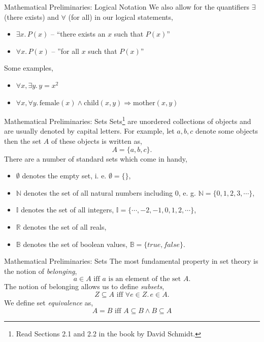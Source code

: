 \documentclass{beamer}
\begin{document}
\begin{frame}{\large Mathematical  Preliminaries: Logical Notation}
We also allow for the quantifiers $\exists$ (there exists) and $\forall$ (for all) in our logical
statements,
\begin{itemize}
\item $\exists x.\,P(x)$ -- ``there exists an $x$ such that $P(x)$''
\item $\forall x.\,P(x)$ -- ''for all $x$ such that $P(x)$''
\end{itemize}
Some examples,
\begin{itemize}
\item $\forall x,\exists y.\, y = x^2$
\item $\forall x, \forall y.\, \mbox{female}(x) \wedge \mbox{child}(x,y) \Rightarrow \mbox{mother}(x,y)$ 
\end{itemize}

\end{frame}


\begin{frame}{\large Mathematical  Preliminaries: Sets}
Sets\footnote{\tiny Read Sections 2.1 and 2.2 in the book by David Schmidt.}
 are unordered collections of objects and are usually denoted by capital letters.  For example,
let $a,b,c$ denote some objects then the set $A$ of these objects is written as,
\[
A = \{a,b,c\}.
\]
There are a number of standard sets which come in handy,
\begin{itemize}
\item $\emptyset$ denotes the empty set, i. e. $\emptyset = \{ \}$,
\item $\mathbb N$ denotes the set of all natural numbers including 0, e. g. ${\mathbb N} = \{0,1,2,3,\cdots\}$, 
\item $\mathbb I$ denotes the set of all integers, ${\mathbb I}= \{\cdots,-2,-1,0,1,2,\cdots\}$,
\item $\mathbb R$ denotes the set of all reals,
\item $\mathbb B$ denotes the set of boolean values, ${\mathbb B} = \{\mathit{true}, \mathit{false} \}$.
\end{itemize}
\end{frame}

\begin{frame}{\large Mathematical  Preliminaries: Sets}
The most fundamental property in set theory is the notion of {\em belonging},
\[
a \in A \mbox{ iff  $a$ is an element of the set $A$}.
\]
The notion of belonging allows us
to define {\em subsets},
\[
Z \subseteq A \mbox{ iff } \forall e\in Z.\, e\in A.
\]
We define set {\em equivalence} as,
\[
A = B \mbox{ iff } A \subseteq B \wedge B \subseteq A
\]
\end{frame}
\end{document}
